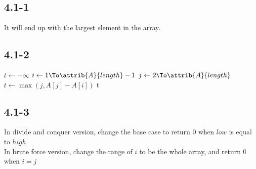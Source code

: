 \subsection{4.1-1}
    It will end up with the largest element in the array.

\subsection{4.1-2}
    \begin{codebox}
        \li $t \gets -\infty$
        \li \For $i \gets 1 \To \attrib{A}{length}-1$
            \Do
        \li     \For $j \gets 2 \To \attrib{A}{length}$
                \Do
        \li         $t \gets \max(j, A[j] - A[i])$
                \End
        \li \Return t
            \End
    \end{codebox}

\subsection{4.1-3}
    In divide and conquer version, change the base case to return 0 when $low$
    is equal to $high$. \\
    In brute force version, change the range of $i$ to be the whole array, and
    return 0 when $i = j$
